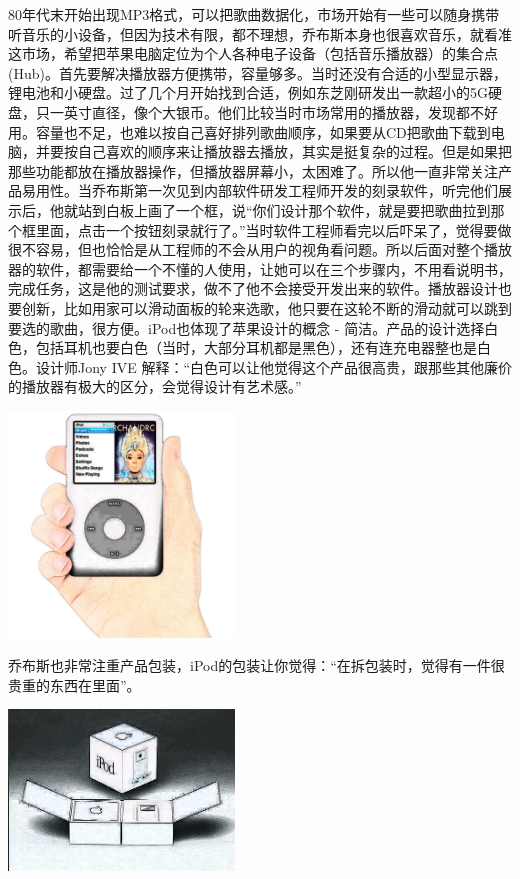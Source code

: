 80年代末开始出现MP3格式，可以把歌曲数据化，市场开始有一些可以随身携带听音乐的小设备，但因为技术有限，都不理想，乔布斯本身也很喜欢音乐，就看准这市场，希望把苹果电脑定位为个人各种电子设备（包括音乐播放器）的集合点(Hub)。首先要解决播放器方便携带，容量够多。当时还没有合适的小型显示器，锂电池和小硬盘。过了几个月开始找到合适，例如东芝刚研发出一款超小的5G硬盘，只一英寸直径，像个大银币。他们比较当时市场常用的播放器，发现都不好用。容量也不足，也难以按自己喜好排列歌曲顺序，如果要从CD把歌曲下载到电脑，并要按自己喜欢的顺序来让播放器去播放，其实是挺复杂的过程。但是如果把那些功能都放在播放器操作，但播放器屏幕小，太困难了。所以他一直非常关注产品易用性。当乔布斯第一次见到内部软件研发工程师开发的刻录软件，听完他们展示后，他就站到白板上画了一个框，说``你们设计那个软件，就是要把歌曲拉到那个框里面，点击一个按钮刻录就行了。''当时软件工程师看完以后吓呆了，觉得要做很不容易，但也恰恰是从工程师的不会从用户的视角看问题。所以后面对整个播放器的软件，都需要给一个不懂的人使用，让她可以在三个步骤内，不用看说明书，完成任务，这是他的测试要求，做不了他不会接受开发出来的软件。播放器设计也要创新，比如用家可以滑动面板的轮来选歌，他只要在这轮不断的滑动就可以跳到要选的歌曲，很方便。iPod也体现了苹果设计的概念
-
简洁。产品的设计选择白色，包括耳机也要白色（当时，大部分耳机都是黑色），还有连充电器整也是白色。设计师Jony
IVE
解释：``白色可以让他觉得这个产品很高贵，跟那些其他廉价的播放器有极大的区分，会觉得设计有艺术感。''


\includegraphics[width=6cm]{R-C_(2)_副本.jpg}

乔布斯也非常注重产品包装，iPod的包装让你觉得：``在拆包装时，觉得有一件很贵重的东西在里面''。


\includegraphics[width=6cm]{IpodPackageScreenshot_2023-07-23_201312_labi.jpg}

